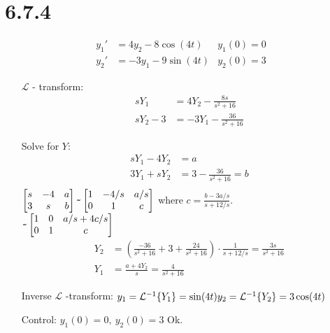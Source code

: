 \documentclass[11pt,a4paper]{article}
\newcommand{\Laplace}{\mathcal{L}}
\begin{document}
\section*{6.7.4}
\begin{align*}
    y_1' &= 4y_2 - 8\cos(4t) & y_1(0) = 0 \\
    y_2' &= -3y_1 - 9\sin(4t) & y_2(0) = 3
\end{align*}
\begin{itemize}[leftmargin=4.0cm,labelsep=0.5cm]
\item[$\Laplace$ - transform:]
    \begin{align*}
        sY_1 &= 4Y_2 - \frac{8s}{s^2+16} \\
        sY_2 -3 &= -3Y_1 - \frac{36}{s^2+16}
    \end{align*}
\item[Solve for $Y$:]
    \begin{align*}
        sY_1 - 4Y_2 &= a \\
        3Y_1 + sY_2 &= 3 - \frac{36}{s^2+16} = b \\
    \end{align*}
    $\begin{bmatrix}
        s &-4  &a \\ 
        3 &s  &b 
    \end{bmatrix}
    \verb|~| \begin{bmatrix}
    1 &-4/s  &a/s \\ 
    0 &1  &c 
    \end{bmatrix}$ where $c = \frac{b-3a/s}{s+12/s}$. \\
    $\verb|~| \begin{bmatrix}
    1 &0  &a/s + 4c/s \\ 
    0 &1  &c 
    \end{bmatrix}$ \\
    \begin{align*}
        Y_2 &= \left(\frac{-36}{s^2+16}+3+\frac{24}{s^2+16}\right) \cdot \frac{1}{s+12/s}
        = \frac{3s}{s^2+16} \\
        Y_1 &= \frac{a+4Y_2}{s} = \frac{4}{s^2+16}
    \end{align*}
\item[Inverse $\Laplace$ -transform:]
    $ y_1 = \Laplace^{-1}\{Y_1\} = \sin(4t) \\
    y_2 = \Laplace^{-1}\{Y_2\} = 3\cos(4t)$
\item[Control:] 
    $y_1(0) = 0,\ y_2(0) = 3$ Ok.
\end{itemize}
\end{document}
